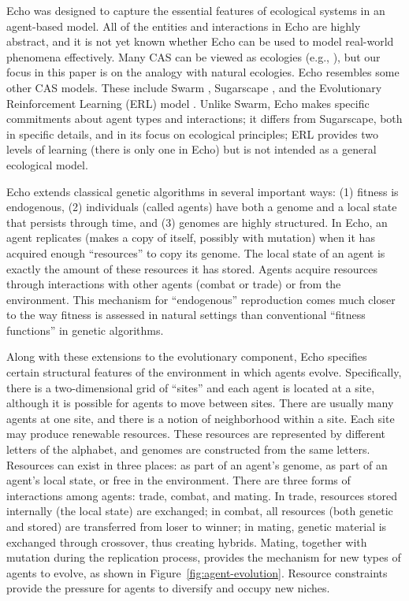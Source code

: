 Echo was designed to capture the essential features of ecological
systems in an agent-based model.  All of the entities and interactions
in Echo are highly abstract, and it is not yet known whether Echo can
be used to model real-world phenomena effectively.  Many CAS can be
viewed as ecologies (e.g., \cite{Huberman91}), but our focus in this
paper is on the analogy with natural ecologies.  Echo resembles some
other CAS models.  These include Swarm \cite{Langton94}, Sugarscape
\cite{Epstein94}, and the Evolutionary Reinforcement Learning (ERL) model
\cite{AckleyAndLittman92}.  Unlike Swarm, Echo makes specific
commitments about agent types and interactions; it differs from
Sugarscape, both in specific details, and in its focus on ecological
principles; ERL provides two levels of learning (there is only one in
Echo) but is not intended as a general ecological model.

Echo extends classical genetic algorithms in several important ways:
(1) fitness is endogenous, (2) individuals (called agents) have both a
genome and a local state that persists through time, and (3) genomes
are highly structured.  In Echo, an agent replicates (makes a copy of
itself, possibly with mutation) when it has acquired enough
``resources'' to copy its genome.  The local state of an agent is
exactly the amount of these resources it has stored.  Agents acquire
resources through interactions with other agents (combat or trade) or
from the environment.  This mechanism for ``endogenous'' reproduction
comes much closer to the way fitness is assessed in natural settings
than conventional ``fitness functions'' in genetic algorithms.

Along with these extensions to the evolutionary component, Echo
specifies certain structural features of the environment in which
agents evolve.  Specifically, there is a two-dimensional grid of
``sites'' and each agent is located at a site, although it is possible
for agents to move between sites.  There are usually many agents at
one site, and there is a notion of neighborhood within a site.  Each
site may produce renewable resources.  These resources are represented
by different letters of the alphabet, and genomes are constructed from
the same letters.  Resources can exist in three places: as part of an
agent's genome, as part of an agent's local state, or free in the
environment.  There are three forms of interactions among agents:
trade, combat, and mating.  In trade, resources stored internally (the
local state) are exchanged; in combat, all resources (both genetic and
stored) are transferred from loser to winner; in mating, genetic
material is exchanged through crossover, thus creating hybrids.
Mating, together with mutation during the replication process,
provides the mechanism for new types of agents to evolve, as shown in
Figure~\ref{fig:agent-evolution}.  Resource constraints provide the
pressure for agents to diversify and occupy new niches.

